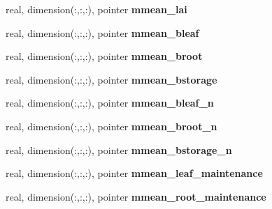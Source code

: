 \begin{DoxyCompactItemize}
\item 
\hypertarget{structed__state__vars_1_1edtype_aadd0be54801881b9b75af88643c71c14}{
real, dimension(:,:,:), pointer {\bfseries mmean\_\-lai}}
\label{structed__state__vars_1_1edtype_aadd0be54801881b9b75af88643c71c14}

\item 
\hypertarget{structed__state__vars_1_1edtype_a49cf16d4638a442fe09d436c710ebc7e}{
real, dimension(:,:,:), pointer {\bfseries mmean\_\-bleaf}}
\label{structed__state__vars_1_1edtype_a49cf16d4638a442fe09d436c710ebc7e}

\item 
\hypertarget{structed__state__vars_1_1edtype_a0de17beefe71f88e364c28af26c64f90}{
real, dimension(:,:,:), pointer {\bfseries mmean\_\-broot}}
\label{structed__state__vars_1_1edtype_a0de17beefe71f88e364c28af26c64f90}

\item 
\hypertarget{structed__state__vars_1_1edtype_a9504991f65785f46231478db7a118e2b}{
real, dimension(:,:,:), pointer {\bfseries mmean\_\-bstorage}}
\label{structed__state__vars_1_1edtype_a9504991f65785f46231478db7a118e2b}

\item 
\hypertarget{structed__state__vars_1_1edtype_a7ec2e6927f66091a7a0cd0ae1465b226}{
real, dimension(:,:,:), pointer {\bfseries mmean\_\-bleaf\_\-n}}
\label{structed__state__vars_1_1edtype_a7ec2e6927f66091a7a0cd0ae1465b226}

\item 
\hypertarget{structed__state__vars_1_1edtype_ab9067a857598a211f7dadcf3e7a5536a}{
real, dimension(:,:,:), pointer {\bfseries mmean\_\-broot\_\-n}}
\label{structed__state__vars_1_1edtype_ab9067a857598a211f7dadcf3e7a5536a}

\item 
\hypertarget{structed__state__vars_1_1edtype_ab83a9df761c59e4b2ebfb60c488bc8ea}{
real, dimension(:,:,:), pointer {\bfseries mmean\_\-bstorage\_\-n}}
\label{structed__state__vars_1_1edtype_ab83a9df761c59e4b2ebfb60c488bc8ea}

\item 
\hypertarget{structed__state__vars_1_1edtype_acbb752fe055524dd821129efcde7f416}{
real, dimension(:,:,:), pointer {\bfseries mmean\_\-leaf\_\-maintenance}}
\label{structed__state__vars_1_1edtype_acbb752fe055524dd821129efcde7f416}

\item 
\hypertarget{structed__state__vars_1_1edtype_a4749c58ba46b39ab31eaa952dbc55953}{
real, dimension(:,:,:), pointer {\bfseries mmean\_\-root\_\-maintenance}}
\label{structed__state__vars_1_1edtype_a4749c58ba46b39ab31eaa952dbc55953}


\end{DoxyCompactItemize}
